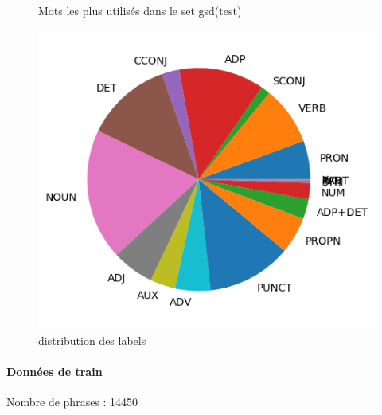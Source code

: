 \begin{figure}[H]
\begin{minipage}{0.48\textwidth}
\begin{tabular}{|l || *{11 }{|c} |}
\end{tabular}
\caption{ Mots les plus utilisés dans le set gsd(test) } \label{Fig:muw}\end{minipage} 
\begin{minipage}{0.48\textwidth} \centering
\includegraphics[width=.7\linewidth]{gsdtest_img.png}
\caption{distribution des labels}
\end{minipage}
\end{figure} \paragraph{Données de train \\ }  
 Nombre de phrases : 14450\\ 
